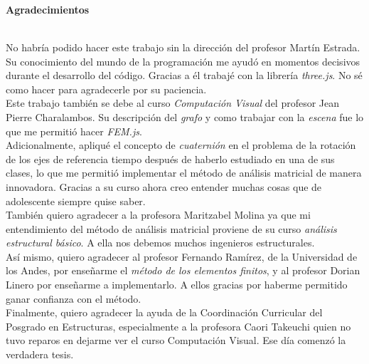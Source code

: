 \newpage{\pagestyle{empty}\cleardoublepage}

\newpage
\thispagestyle{empty} \textbf{}\normalsize
\\\\\\%
\textbf{\LARGE Agradecimientos}
\\

No habría podido hacer este trabajo sin la dirección del profesor Martín Estrada. Su conocimiento del mundo de la programación me ayudó en momentos decisivos durante el desarrollo del código. Gracias a él trabajé con la librería \emph{three.js}. No sé como hacer para agradecerle por su paciencia.\\

Este trabajo también se debe al curso \emph{Computación Visual} del profesor Jean Pierre Charalambos. Su descripción del \emph{grafo} y como trabajar con la \emph{escena} fue lo que me permitió hacer \emph{FEM.js}.\\

Adicionalmente, apliqué el concepto de \emph{cuaternión} en el problema de la rotación de los ejes de referencia tiempo después de haberlo estudiado en una de sus clases, lo que me permitió implementar el método de análisis matricial de manera innovadora. Gracias a su curso ahora creo entender muchas cosas que de adolescente siempre quise saber.\\

También quiero agradecer a la profesora Maritzabel Molina ya que mi entendimiento del método de análisis matricial proviene de su curso \emph{análisis estructural básico}. A ella nos debemos muchos ingenieros estructurales.\\

Así mismo, quiero agradecer al profesor Fernando Ramírez, de la Universidad de los Andes, por enseñarme el \emph{método de los elementos finitos}, y al profesor Dorian Linero por enseñarme a implementarlo. A ellos gracias por haberme permitido ganar confianza con el método.\\

Finalmente, quiero agradecer la ayuda de la Coordinación Curricular del Posgrado en Estructuras, especialmente a la profesora Caori Takeuchi quien no tuvo reparos en dejarme ver el curso Computación Visual. Ese día comenzó la verdadera tesis.\\


\newpage{\pagestyle{empty}\cleardoublepage}

